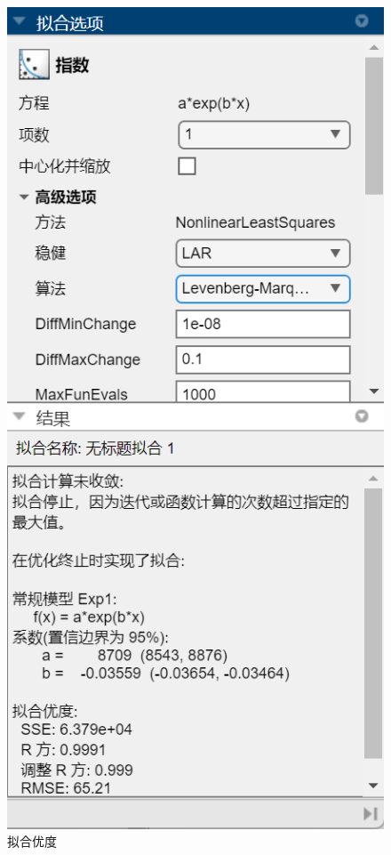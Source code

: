 \documentclass[UTF8]{article}
\theoremstyle{MyLineTheoremStyle} %
\theoremstyle{MyBlockTheoremStyle} %
\theoremstyle{MySubsubsectionStyle} %
\begin{document}
\begin{center}
\begin{minipage}{0.25\columnwidth}
\begin{figure}[H]
\includegraphics[width=\columnwidth]{assets/1.4/d652817bd53c95bcd5a3e9e751c357bb.png}
\caption{拟合优度}\label{1.4优度}
\end{figure}
    \end{minipage}
\end{center}
\end{document}
